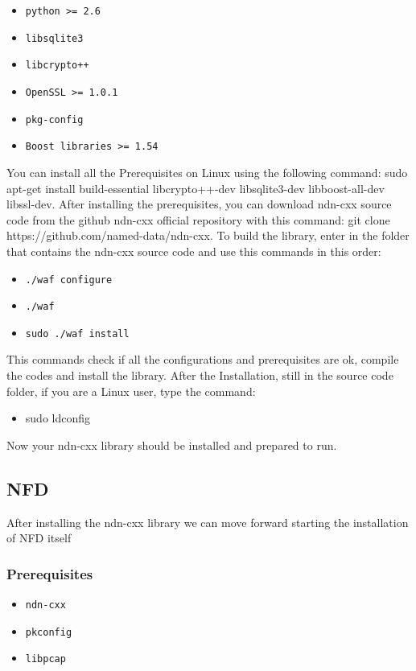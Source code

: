 \documentclass[11pt,conference]{./IEEEtran}
\begin{document}
	\begin{itemize}
		
           \item    \texttt{python >= 2.6 }
	   \item    \texttt{libsqlite3 }
       	   \item    \texttt{libcrypto++ }
	   \item    \texttt{OpenSSL >= 1.0.1 }
           \item    \texttt{pkg-config }
	   \item    \texttt{Boost libraries >= 1.54 }    
	\end{itemize} 
You can install all the Prerequisites on Linux using the following command: sudo apt-get install build-essential libcrypto++-dev libsqlite3-dev libboost-all-dev libssl-dev. 
After installing the prerequisites, you can download ndn-cxx source code from the github ndn-cxx official repository with this command: git clone https://github.com/named-data/ndn-cxx.
To build the library, enter in the folder that contains the ndn-cxx source code and use this commands in this order:
\begin{itemize}
 \item \texttt{./waf configure} 
 \item \texttt{./waf}
 \item \texttt{sudo ./waf install}
\end{itemize}
This commands check if all the configurations and prerequisites are ok, compile the codes and install the library.
After the Installation, still in the source code folder, if you are a Linux user, type the command: 
\begin{itemize}
 \item sudo ldconfig 
\end{itemize}
Now your ndn-cxx library should be installed and prepared to run.
	\subsection{NFD}  After installing the ndn-cxx library we can move forward starting the installation of NFD itself
	\subsubsection{Prerequisites}
	\begin{itemize}
		\item \texttt{ndn-cxx}
		
		\item \texttt{pkconfig}
		
		\item \texttt{libpcap}
		
	\end{itemize}
\end{document}
